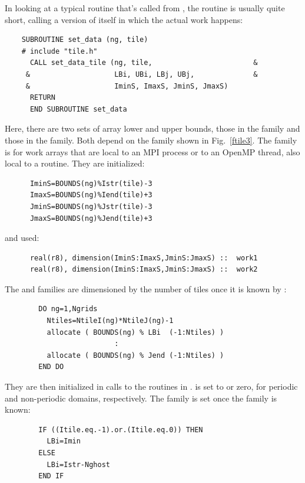 In looking at a typical routine that's called from ,
the routine is usually quite short, calling a 
version of itself in which the actual work happens:
\begin{verbatim}
    SUBROUTINE set_data (ng, tile)
    # include "tile.h"
      CALL set_data_tile (ng, tile,                        &
     &                    LBi, UBi, LBj, UBj,              &
     &                    IminS, ImaxS, JminS, JmaxS)
      RETURN
      END SUBROUTINE set_data
\end{verbatim}
Here, there are two sets of array lower and upper bounds, those
in the  family and those in the  family. Both
depend on the  family shown in Fig.\ \ref{ftile3}. The
 family is for work arrays that are local to an MPI
process or to an OpenMP thread, also local to a 
routine. They are initialized:
\begin{verbatim}
      IminS=BOUNDS(ng)%Istr(tile)-3
      ImaxS=BOUNDS(ng)%Iend(tile)+3
      JminS=BOUNDS(ng)%Jstr(tile)-3
      JmaxS=BOUNDS(ng)%Jend(tile)+3
\end{verbatim}
and used:
\begin{verbatim}
      real(r8), dimension(IminS:ImaxS,JminS:JmaxS) ::  work1
      real(r8), dimension(IminS:ImaxS,JminS:JmaxS) ::  work2
\end{verbatim}
The  and  families are dimensioned by the number
of tiles once it is known by :
\begin{verbatim}
        DO ng=1,Ngrids
          Ntiles=NtileI(ng)*NtileJ(ng)-1
          allocate ( BOUNDS(ng) % LBi  (-1:Ntiles) )
                          :
          allocate ( BOUNDS(ng) % Jend (-1:Ntiles) )
        END DO
\end{verbatim}
They are then initialized in calls to the routines in
.  is set to 
or zero, for periodic and non-periodic domains, respectively. The
 family is set once the  family is known:
\begin{verbatim}
        IF ((Itile.eq.-1).or.(Itile.eq.0)) THEN 
          LBi=Imin
        ELSE
          LBi=Istr-Nghost
        END IF
\end{verbatim}

